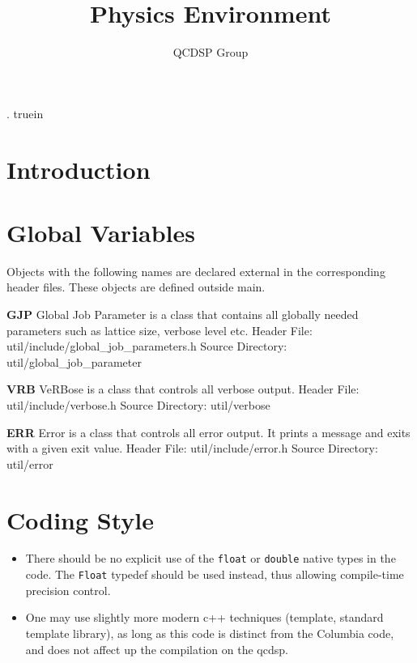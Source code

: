 \documentclass[12pt]{article}
\begin{document}
\title{\bf Physics Environment}
. truein
\author{QCDSP Group}
\maketitle

%

\tableofcontents

\newpage

\section{Introduction}
\label{sec-introduction}




\section{Global Variables}
\label{sec-global}

Objects with the following names are declared external in the corresponding
header files. These objects are defined outside main.


\medskip
{\noindent}
{\bf GJP} Global Job Parameter is a class that
contains all globally needed parameters such as lattice size, verbose
level etc.
\hfill \break
Header File: util/include/global\_job\_parameters.h
\hfill \break
Source Directory: util/global\_job\_parameter


\medskip
{\noindent}
{\bf VRB} VeRBose is a class that controls all verbose output.
\hfill \break
Header File: util/include/verbose.h
\hfill \break
Source Directory: util/verbose


\medskip
{\noindent}
{\bf ERR} Error is a class that controls all error output.
It prints a message and exits with a given exit value.
\hfill \break
Header File: util/include/error.h
\hfill \break
Source Directory: util/error



\section{Coding Style}
\begin{itemize}

\item There should be no explicit use of the {\tt float} or {\tt double}
native types in the code.  The {\tt Float} typedef should be used instead,
thus allowing compile-time precision control.

\item One may use slightly more modern c++ techniques (template, standard template
library), as long as this code is distinct from the Columbia code, and does not affect up the compilation on the qcdsp.

\end{itemize}
\end{document}
